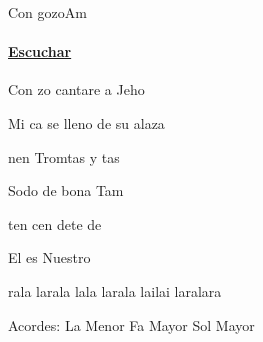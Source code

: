 \documentclass[12pt, spanish]{book}
\newcommand{\NotCCLIed}{\relax}
\begin{document}
    \begin{song}{Con gozo}{Am}
        {} %
        {}
        {} %
        {} %
        \ifChordBk
        \paragraph{\mbox{}\hfill\protect\href{https://open.spotify.com/intl-es/track/0APaS55OJ4Uox1CGv6CIFH}{Escuchar}\mbox{}\hfill}
        \fi


        \begin{SBOpGroup}
            Con zo cantare a Jeho

            Mi ca se lleno de su alaza
        \end{SBOpGroup}

        \begin{SBChorus}
            nen Tromtas y tas

            Sodo de bona Tam

            ten cen dete de 

            El es Nuestro 
        \end{SBChorus}

        \begin{SBOpGroup}
            rala larala lala larala lailai laralara
        \end{SBOpGroup}

        \ifChordBk
        \begin{SBOpGroup}
            Acordes:\break
            \upchord{\Am}\qquad La Menor \hfill
            \upchord{\F}\qquad Fa Mayor \hfill
            \upchord{\G}\qquad Sol Mayor \hfill\null\break
        \end{SBOpGroup}
        \fi
    \end{song}
\end{document}
